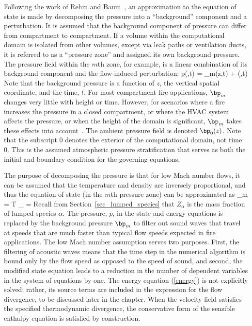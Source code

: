 Following the work of Rehm and Baum~\cite{Rehm:1}, an approximation to the equation of state is made by decomposing the pressure
into a ``background'' component and a perturbation. It is assumed that
the background component of pressure can differ from compartment to compartment. If
a volume within the computational domain is isolated from other volumes, except via leak paths or ventilation ducts, it is referred to as a ``pressure zone'' and assigned its own background pressure. The pressure field within the $m$th zone, for example, is a linear combination
of its background component and the flow-induced perturbation:
\be
   p(\bx,t) = \bp_m(z,t) + \tp(\bx,t)
\ee
Note that the background pressure is a function of $z$, the vertical spatial coordinate, and the time, $t$. For most compartment fire applications, $\bp_m$ changes very little with height or time. However, for scenarios where a fire increases the pressure in a closed compartment, or where the HVAC system affects the pressure, or when the height of the domain is significant, $\bp_m$ takes these effects into account~\cite{Baum:5}. The ambient pressure field is denoted $\bp_0(z)$. Note that the subscript 0 denotes the exterior of the computational domain, not time 0. This is the assumed atmospheric pressure stratification that serves as both the initial and boundary condition for the governing equations.

The purpose of decomposing the pressure is that for low Mach number flows, it can be assumed that the temperature and density are inversely proportional, and thus the equation of state (in the $m$th pressure zone) can be approximated as
\be
   \bp_m  =  \rho T \R \sum_\alpha {} =   \label{state}
\ee
Recall from Section~\ref{sec_lumped_species} that $Z_\alpha$ is the mass fraction of lumped species $\alpha$. The pressure, $p$, in the state and energy equations is replaced by the background pressure $\bp_m$ to filter out sound waves that travel at speeds that are much faster than typical flow speeds expected in fire applications. The low Mach number assumption serves two purposes. First, the filtering of acoustic waves means that the time step in the numerical algorithm is bound only by the flow speed as opposed to the speed of sound, and second, the modified state equation leads to a reduction in the number of dependent variables in the system of equations by one. The energy equation (\ref{energy}) is not explicitly solved; rather, its source terms are included in the expression for the flow divergence, to be discussed later in the chapter.  When the velocity field satisfies the specified thermodynamic divergence, the conservative form of the sensible enthalpy equation is satisfied by construction.

